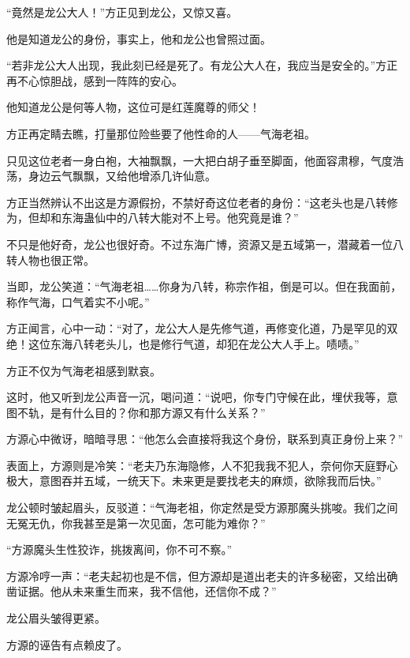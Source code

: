 
\begin{this_body}



“竟然是龙公大人！”方正见到龙公，又惊又喜。

他是知道龙公的身份，事实上，他和龙公也曾照过面。

“若非龙公大人出现，我此刻已经是死了。有龙公大人在，我应当是安全的。”方正再不心惊胆战，感到一阵阵的安心。

他知道龙公是何等人物，这位可是红莲魔尊的师父！

方正再定睛去瞧，打量那位险些要了他性命的人——气海老祖。

只见这位老者一身白袍，大袖飘飘，一大把白胡子垂至脚面，他面容肃穆，气度浩荡，身边云气飘飘，又给他增添几许仙意。

方正当然辨认不出这是方源假扮，不禁好奇这位老者的身份：“这老头也是八转修为，但却和东海蛊仙中的八转大能对不上号。他究竟是谁？”

不只是他好奇，龙公也很好奇。不过东海广博，资源又是五域第一，潜藏着一位八转人物也很正常。

当即，龙公笑道：“气海老祖……你身为八转，称宗作祖，倒是可以。但在我面前，称作气海，口气着实不小呢。”

方正闻言，心中一动：“对了，龙公大人是先修气道，再修变化道，乃是罕见的双绝！这位东海八转老头儿，也是修行气道，却犯在龙公大人手上。啧啧。”

方正不仅为气海老祖感到默哀。

这时，他又听到龙公声音一沉，喝问道：“说吧，你专门守候在此，埋伏我等，意图不轨，是有什么目的？你和那方源又有什么关系？”

方源心中微讶，暗暗寻思：“他怎么会直接将我这个身份，联系到真正身份上来？”

表面上，方源则是冷笑：“老夫乃东海隐修，人不犯我我不犯人，奈何你天庭野心极大，意图吞并五域，一统天下。未来更是要找老夫的麻烦，欲除我而后快。”

龙公顿时皱起眉头，反驳道：“气海老祖，你定然是受方源那魔头挑唆。我们之间无冤无仇，你我甚至是第一次见面，怎可能为难你？”

“方源魔头生性狡诈，挑拨离间，你不可不察。”

方源冷哼一声：“老夫起初也是不信，但方源却是道出老夫的许多秘密，又给出确凿证据。他从未来重生而来，我不信他，还信你不成？”

龙公眉头皱得更紧。

方源的诬告有点赖皮了。


\end{this_body}
